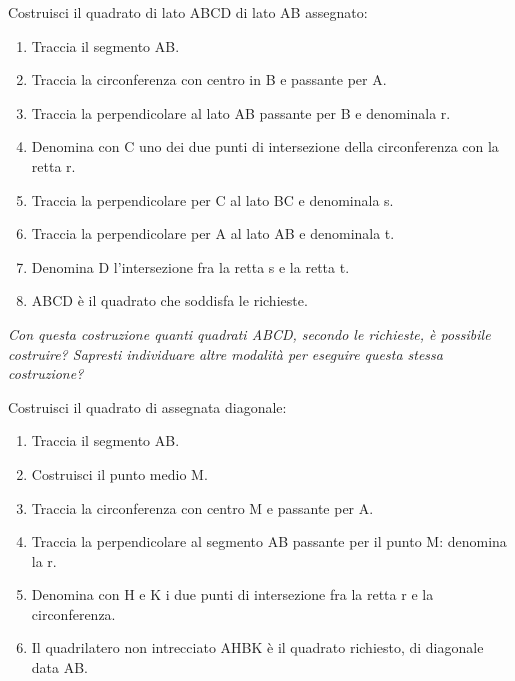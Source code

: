 \begin{procedura}
Costruisci il quadrato di lato ABCD di lato AB assegnato:
\begin{enumerate} [nosep]
\item 
Traccia il segmento AB.
\item 
Traccia la circonferenza con centro in B e passante per A.
\item 
Traccia la perpendicolare al lato AB passante per B e denominala r.
\item 
Denomina con C uno dei due punti di intersezione della circonferenza con la 
retta r.
\item 
Traccia la perpendicolare per C al lato BC e denominala s.
\item 
Traccia la perpendicolare per A al lato AB e denominala t.
\item
Denomina D l'intersezione fra la retta s e la retta t.
\item
ABCD è il quadrato che soddisfa le richieste.
\end{enumerate}
\textit{Con questa costruzione quanti quadrati ABCD, secondo le richieste, è 
possibile costruire?
Sapresti individuare altre modalità per eseguire questa stessa costruzione? 
}
\end{procedura}


\begin{procedura}
Costruisci il quadrato di assegnata diagonale:
\begin{enumerate} [nosep]
\item 
Traccia il segmento AB.
\item 
Costruisci il punto medio M.
\item 
Traccia la circonferenza con centro M e passante per A.
\item 
Traccia la perpendicolare al segmento AB passante per il punto M: 
denomina la r.
\item 
Denomina con H e K i due punti di intersezione fra la retta r e la 
circonferenza.
\item 
Il quadrilatero non intrecciato AHBK è il quadrato richiesto, di diagonale 
data AB.
\end{enumerate}
\end{procedura}
% 
% 
% 
